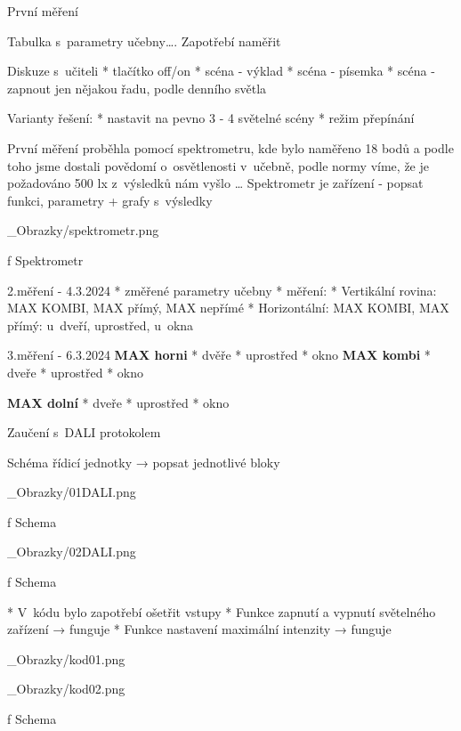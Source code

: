 \sec První měření

Tabulka s~parametry učebny…. Zapotřebí naměřit
\medskip

Diskuze s~učiteli
\begitems
    * tlačítko off/on
    * scéna - výklad
    * scéna - písemka
    * scéna - zapnout jen nějakou řadu, podle denního světla
\enditems

\begitems
Varianty řešení:
    * nastavit na pevno 3 - 4 světelné scény
    * režim přepínání
\enditems

\medskip
První měření proběhla pomocí spektrometru, kde bylo naměřeno 18 bodů a podle toho jsme dostali povědomí
o~osvětlenosti v~učebně, podle normy víme, že je požadováno 500 lx z~výsledků nám vyšlo …
Spektrometr je zařízení - popsat funkci, parametry + grafy s~výsledky

\medskip {}
\picw=5cm _Obrazky/spektrometr.png
\caption/f Spektrometr
\medskip

\sec 2.měření - 4.3.2024
\begitems
    * změřené parametry učebny
    * měření:
    * Vertikální rovina: MAX KOMBI, MAX přímý, MAX nepřímé
    * Horizontální: MAX KOMBI, MAX přímý: u~dveří, uprostřed, u~okna
\enditems

\sec 3.měření - 6.3.2024
{\bf MAX horni}
\begitems
    * dvěře
    * uprostřed
    * okno
\enditems
\medskip
\begitems
{\bf MAX kombi}
    * dveře
    * uprostřed
    * okno
\enditems
\medskip

\begitems
{\bf MAX dolní}
    * dveře
    * uprostřed
    * okno
\enditems

\sec Zaučení s~DALI protokolem

Schéma řídicí jednotky → popsat jednotlivé bloky

\medskip
\picw=12cm _Obrazky/01DALI.png
\caption/f Schema
\medskip

\medskip
\picw=13cm _Obrazky/02DALI.png
\caption/f Schema
\medskip

\begitems
    * V~kódu bylo zapotřebí ošetřit vstupy
    * Funkce zapnutí a vypnutí světelného zařízení → funguje
    * Funkce nastavení maximální intenzity → funguje
\enditems

\medskip
\picw=15cm _Obrazky/kod01.png
\medskip

\medskip
\picw=15cm _Obrazky/kod02.png
\caption/f Schema
\medskip